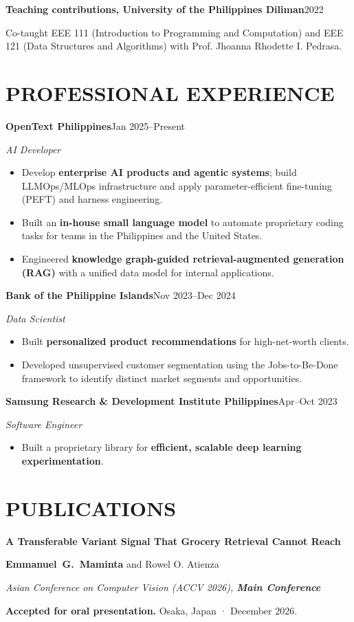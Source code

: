 \documentclass[11pt,a4paper]{article}
\newcommand{\dated}[2]{\textbf{#1}\hfill #2\par}
\newcommand{\role}[3]{\Needspace{4\baselineskip}\dated{#1}{#2}\textit{#3}\par}
\newcommand{\paper}[4]{%
  \Needspace{6\baselineskip}%
  \textbf{#1}\par
  #2\par
  \textit{#3}\par
  #4\par\vspace{8pt}}
\newcommand{\me}{\mbox{\textbf{Emmanuel G. Maminta}}}
\begin{document}
\vspace{3pt}
\dated{Teaching contributions, University of the Philippines Diliman}{2022}
Co-taught EEE 111 (Introduction to Programming and Computation) and EEE 121 (Data Structures and Algorithms) with Prof. Jhoanna Rhodette I. Pedrasa.\par

\section{PROFESSIONAL EXPERIENCE}
\role{OpenText Philippines}{Jan 2025–Present}{AI Developer}
\begin{itemize}
  \item Develop \textbf{enterprise AI products and agentic systems}; build LLMOps/MLOps infrastructure and apply parameter-efficient fine-tuning (PEFT) and harness engineering.
  \item Built an \textbf{in-house small language model} to automate proprietary coding tasks for teams in the Philippines and the United States.
  \item Engineered \textbf{knowledge graph-guided retrieval-augmented generation (RAG)} with a unified data model for internal applications.
\end{itemize}
\vspace{4pt}
\role{Bank of the Philippine Islands}{Nov 2023–Dec 2024}{Data Scientist}
\begin{itemize}
  \item Built \textbf{personalized product recommendations} for high-net-worth clients.
  \item Developed unsupervised customer segmentation using the Jobs-to-Be-Done framework to identify distinct market segments and opportunities.
\end{itemize}
\vspace{4pt}
\role{Samsung Research \& Development Institute Philippines}{Apr–Oct 2023}{Software Engineer}
\begin{itemize}
  \item Built a proprietary library for \textbf{efficient, scalable deep learning experimentation}.
\end{itemize}

\newpage

\section{PUBLICATIONS}
\paper{A Transferable Variant Signal That Grocery Retrieval Cannot Reach}
{\me{} and Rowel O. Atienza}
{Asian Conference on Computer Vision (ACCV 2026), \textbf{Main Conference}}
{\textbf{Accepted for oral presentation.} Osaka, Japan · December 2026.}
\end{document}
